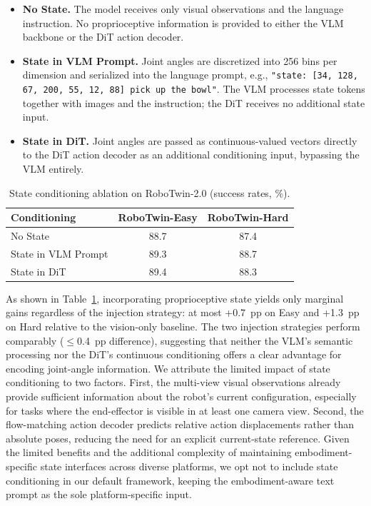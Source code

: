 \documentclass{llmxive}
\begin{document}
\begin{itemize}[leftmargin=*,itemsep=2pt]
\item \textbf{No State.} The model receives only visual observations and the language instruction. No proprioceptive information is provided to either the VLM backbone or the DiT action decoder.

\item \textbf{State in VLM Prompt.} Joint angles are discretized into 256 bins per dimension and serialized into the language prompt, e.g., \texttt{"state: [34, 128, 67, 200, 55, 12, 88] pick up the bowl"}. The VLM processes state tokens together with images and the instruction; the DiT receives no additional state input.

\item \textbf{State in DiT.} Joint angles are passed as continuous-valued vectors directly to the DiT action decoder as an additional conditioning input, bypassing the VLM entirely.
\end{itemize}

\begin{table}[!th]
\centering
\small
\begin{tabular}{lcc}
\toprule
Conditioning & RoboTwin-Easy & RoboTwin-Hard \\
\midrule
No State & 88.7 & 87.4 \\
State in VLM Prompt & 89.3 & 88.7 \\
State in DiT & 89.4 & 88.3 \\
\bottomrule
\end{tabular}
\caption{State conditioning ablation on RoboTwin-2.0 (success rates, \%).}
\label{tab:state_conditioning}
\end{table}

As shown in Table~\ref{tab:state_conditioning}, incorporating proprioceptive state yields only marginal gains regardless of the injection strategy: at most +0.7~pp on Easy and +1.3~pp on Hard relative to the vision-only baseline.
The two injection strategies perform comparably ($\leq$0.4~pp difference), suggesting that neither the VLM's semantic processing nor the DiT's continuous conditioning offers a clear advantage for encoding joint-angle information.
We attribute the limited impact of state conditioning to two factors.
First, the multi-view visual observations already provide sufficient information about the robot's current configuration, especially for tasks where the end-effector is visible in at least one camera view.
Second, the flow-matching action decoder predicts relative action displacements rather than absolute poses, reducing the need for an explicit current-state reference.
Given the limited benefits and the additional complexity of maintaining embodiment-specific state interfaces across diverse platforms, we opt not to include state conditioning in our default framework, keeping the embodiment-aware text prompt as the sole platform-specific input.
\end{document}
